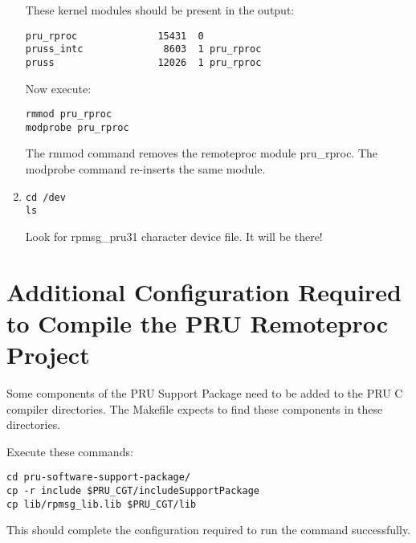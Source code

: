 \begin{enumerate}
These kernel modules should be present in the output:

\begin{verbatim}
pru_rproc              15431  0 
pruss_intc              8603  1 pru_rproc
pruss                  12026  1 pru_rproc
\end{verbatim}
Now execute:
\begin{verbatim}
rmmod pru_rproc
modprobe pru_rproc
\end{verbatim}

The rmmod command removes the remoteproc module pru\_rproc.
The modprobe command re-inserts the same module.
\item  
\begin{verbatim}
cd /dev
ls
\end{verbatim} 

Look for rpmsg\_pru31 character device file.  It will be there!
\end{enumerate}

\section{Additional Configuration Required to Compile the PRU Remoteproc Project}

Some components of the PRU Support Package need to be added to the PRU C compiler directories.  The Makefile expects to find these components in these directories.


Execute these commands:

\begin{verbatim}
cd pru-software-support-package/
cp -r include $PRU_CGT/includeSupportPackage
cp lib/rpmsg_lib.lib $PRU_CGT/lib
\end{verbatim}

This should complete the configuration required to run the command successfully.



